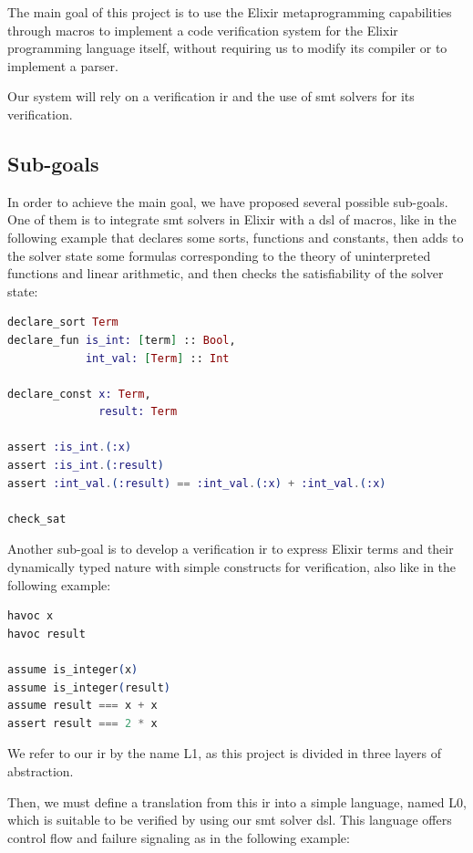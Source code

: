 The main goal of this project is to use the Elixir metaprogramming capabilities
through macros to implement a code verification system for the Elixir
programming language itself, without requiring us to modify its compiler or to
implement a parser.

Our system will rely on a verification \gls{ir} and the use of \acrshort{smt}
solvers for its verification.

\subsection{Sub-goals}

In order to achieve the main goal, we have proposed several possible sub-goals.
One of them is to integrate \acrshort{smt} solvers in Elixir with a \gls{dsl} of
macros, like in the following example that declares some sorts, functions and
constants, then adds to the solver state some formulas corresponding to the
theory of uninterpreted functions and linear arithmetic, and then checks the 
satisfiability of the solver state:

\begin{lstlisting}[language=elixir,numbers=none,frame=none]
declare_sort Term
declare_fun is_int: [term] :: Bool,
            int_val: [Term] :: Int

declare_const x: Term, 
              result: Term

assert :is_int.(:x)
assert :is_int.(:result)
assert :int_val.(:result) == :int_val.(:x) + :int_val.(:x)

check_sat
\end{lstlisting}

Another sub-goal is to develop a verification \gls{ir} to express Elixir terms
and their dynamically typed nature with simple constructs for verification, also
like in the following example:

\begin{lstlisting}[language=elixir,numbers=none,frame=none]
havoc x
havoc result

assume is_integer(x)
assume is_integer(result)
assume result === x + x
assert result === 2 * x 
\end{lstlisting}

We refer to our \gls{ir} by the name L1, as this project is divided in three
layers of abstraction.

Then, we must define a translation from this \gls{ir} into a simple language,
named L0, which is suitable to be verified by using our \acrshort{smt} solver
\gls{dsl}. This language offers control flow and failure signaling as in the
following example:


